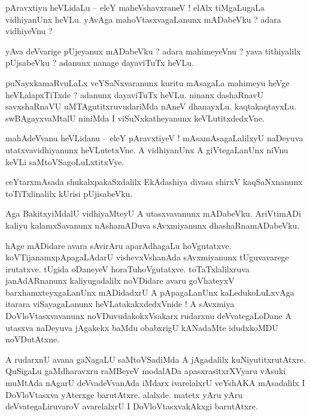 \documentclass{article}
\begin{document}
\begin{mn}%
pAravxtiyu heVLidaLu -- eleY maheVshavxraneV ! elAlx tiMgaLugaLa vidhiyanUnx heVLu. yAvAga 
mahoVtasxvagaLanunx mADabeVku ? adara vidhiyeVnu ?
\end{mn}

\begin{mn}%
yAva deVvarige pUjeyanux mADabeVku ? adara mahimeyeVnu ? yava tithiyalilx pUjsabeVku ? adanunx 
nanage dayaviTuTx heVLu.
\end{mn}

\begin{mn}%
puNayxkamaRvuLaLx veYSaNxvaranunx kuritu mAsagaLa mahimeyu heVge heVLalapxTiTxde ? adanunx 
dayaviTuTx heVLu. ninanx dashaRnavU savxshaRnaVU uMTAgutitxruvudariMda nAneV dhanayxLu. 
kaqtakaqtayxLu. swBAgayxvaMtalU niniMda I viSuNxkatheyanunx keVLutitxdedxVne.
\end{mn}

\begin{mn}%
mahAdeVvanu heVLidanu -- eleY pAravxtiyeV ! mAsamAsagaLalilxyU naDeyuva utatxvavidhiyanunx 
heVLutetxVne. A vidhiyanUnx A giVtegaLanUnx niVnu keVLi saMtoVSagoLuLxtitxVye.
\end{mn}

\begin{mn}%
ceYtarxmAsada shukalxpakaSxdalilx EkAdashiya divasa shirxV kaqSaNxnanunx toTiTxlinalilx kUrisi 
pUjisabeVku.
\end{mn}

\begin{mn}%
Aga BakitxyiMdalU vidhiyaMteyU A utasxvavanunx mADabeVku. AriVtimADi kaliyu kalamxSavanunx 
nAshamADuva sAvxmiyanunx dhashaRnamADabeVku.
\end{mn}

\begin{mn}%
hAge mADidare avara sAvirAru aparAdhagaLu hoVgutatxve. koVTijanamxpApagaLAdarU vishevxVshanAda 
sAvxmiyanunx tUguvavarege irutatxve. tUgida oDaneyeV horaTuhoVgutatxve. toTaTxlalilxruva 
janAdARnanunx kaliyugadalilx noVDidare avaru goVhateyxV barxhamxteyxgaLanUnx mADidadxrU A 
pApagaLanUnx kaLedukoLuLxvAga itarara viSayagaLanunx heVLatakakxdedxVnide ! A sAvxmiya 
DoVloVtasxvavanunx noVDuvudakokxVsakarx rudarxnu deVvategaLoDane A utasxva naDeyuva jAgakekx baMdu 
obabxrigU kANadaMte idudxkoMDU noVDutAtxne. 
\end{mn}

\begin{mn}%
A rudarxnU avana gaNagaLU saMtoVSadiMda A jAgadalilx kuNiyutitxrutAtxre. QuSigaLu gaMdharavxru 
raMBeyeV modalADa apasxrasitxrXVyaru vAsuki muMtAda nAgarU deVvadeVvanAda iMdarx ivarelalxrU 
veYshAKA mAsadalilx I DoVloVtasxva yAterxge barutAtxre. alalxde. matetx yAru yAru 
deVvategaLiruvaroV avarelalxrU I DoVloVtasxvakAkxgi barutAtxre.
\end{mn}
\end{document}
